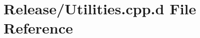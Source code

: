 \hypertarget{_release_2_utilities_8cpp_8d}{\section{\-Release/\-Utilities.cpp.\-d \-File \-Reference}
\label{_release_2_utilities_8cpp_8d}
}
